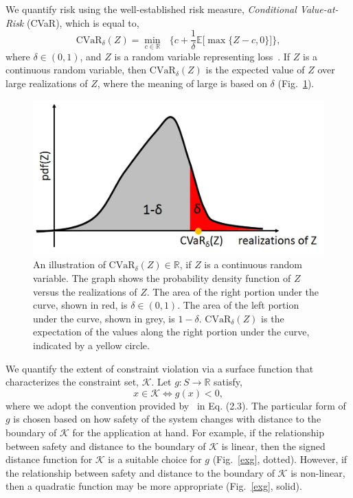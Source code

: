 \documentclass[letterpaper, 10 pt, conference]{ieeeconf}  %
\begin{document}
We quantify risk using the well-established risk measure, \textit{Conditional Value-at-Risk} (CVaR), which is equal to,
\begin{equation}
\text{CVaR}_\delta(Z) = {\underset{c \in \mathbb{R}}\min} \text{ }\Big\{ c + \frac{1}{\delta}\mathbb{E}\big[\max\{Z-c,0\}\big] \Big\},
\label{cvareqn}
\end{equation}
where $\delta \in (0,1)$, and $Z$ is a random variable representing loss~\cite{rockafellar2000optimization}.\footnotemark
{}
If $Z$ is a continuous random variable, then $\text{CVaR}_\delta(Z)$ is the expected value of $Z$ over large realizations of $Z$,
where the meaning of large is based on $\delta$ (Fig.~\ref{cvar}).

\begin{figure}[thpb]
      \centering
      \includegraphics[scale=0.5]{cvar.jpg}
      \caption{An illustration of $\text{CVaR}_\delta(Z) \in \mathbb{R}$, if $Z$ is a continuous random variable. 
	  The graph shows the probability density function of $Z$ versus the realizations of $Z$.
	  The area of the right portion under the curve, shown in red, is $\delta \in (0,1)$.	  
	  The area of the left portion under the curve, shown in grey, is $1-\delta$.
	  $\text{CVaR}_\delta(Z)$ is the expectation of the values along the right portion under the curve, indicated by a yellow circle.}
      \label{cvar}
\end{figure}

We quantify the extent of constraint violation via a surface function that characterizes the constraint set, $\mathcal{K}$.
Let $g: S \rightarrow \mathbb{R}$ satisfy,
\begin{equation}
x \in \mathcal{K} \iff g(x) < 0,
\label{g}
\end{equation}
where we adopt the convention provided by~\cite{EECS-2018-41} in Eq. (2.3). 
The particular form of $g$ is chosen based on how safety of the system changes with distance to the boundary of $\mathcal{K}$ for the application at hand.
For example, if the relationship between safety and distance to the boundary of $\mathcal{K}$ is linear, 
then the signed distance function for $\mathcal{K}$ is a suitable choice for $g$ (Fig.~\ref{exg}, dotted).
However, if the relationship between safety and distance to the boundary of $\mathcal{K}$ is non-linear,
then a quadratic function may be more appropriate (Fig.~\ref{exg}, solid).
\end{document}
